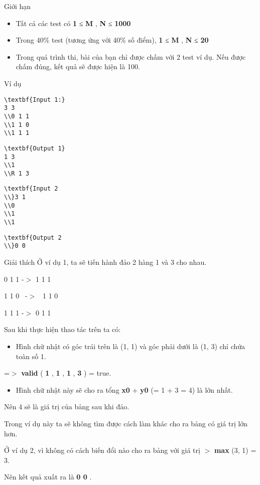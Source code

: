 Giới hạn  
\begin{itemize}
	\item     Tất cả các test có    \textbf{     1    }    ≤    \textbf{     M    }    ,    \textbf{     N    }    ≤    \textbf{     1000    }
	\item     Trong 40\% test (tương ứng với 40\% số điểm),    \textbf{     1    }    ≤    \textbf{     M    }    ,    \textbf{     N    }    ≤    \textbf{     20    }
	\item      Trong quá trình thi, bài của bạn chỉ được chấm với 2 test ví dụ. Nếu được chấm đúng, kết quả sẽ được hiện là 100.    
\end{itemize}
   Ví dụ  
\begin{verbatim}
\textbf{Input 1:}
3 3
\\0 1 1
\\1 1 0
\\1 1 1
\end{verbatim}
\begin{verbatim}
\textbf{Output 1}
1 3
\\1
\\R 1 3
\end{verbatim}
\begin{verbatim}
\textbf{Input 2
\\}3 1
\\0
\\1
\\1\end{verbatim}
\begin{verbatim}
\textbf{Output 2
\\}0 0\end{verbatim}
   Giải thích  
Ở ví dụ 1, ta sẽ tiến hành đảo 2 hàng 1 và 3 cho nhau.  

    0 1 1      -$>$   1 1 1

   1 1 0  -$>$  1 1 0  

1 1 1   -$>$       0 1 1   

   Sau khi thực hiện thao tác trên ta có:  
\begin{itemize}
	\item     Hình chữ nhật có góc trái trên là (1, 1) và góc phải dưới là (1, 3) chỉ chứa toàn số 1.   
\end{itemize}

   =$>$   \textbf{    valid   }   (   \textbf{    1   }   ,   \textbf{    1   }   ,   \textbf{    1   }   ,   \textbf{    3   }   ) = true.  
\begin{itemize}
	\item     Hình chữ nhật này sẽ cho ra tổng    \textbf{     x0    }    +    \textbf{     y0    }    (= 1 + 3 = 4) là lớn nhất.   
\end{itemize}

   Nên 4 sẽ là giá trị của bảng sau khi đảo.  

   Trong ví dụ này ta sẽ không tìm được cách làm khác cho ra bảng có giá trị lớn hơn.  

   Ở ví dụ 2, vì không có cách biến đổi nào cho ra bảng với giá trị   \textbf{}\textbf{    $>$   }\textbf{    max   }   (3, 1) = 3.  

   Nên kết quả xuất ra là   \textbf{    0 0   }   .